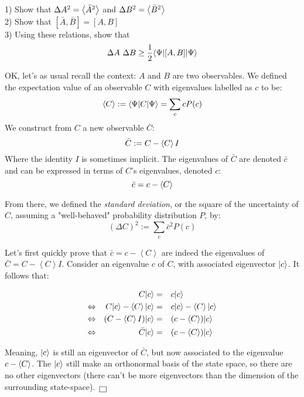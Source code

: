 \documentclass[solutions.tex]{subfiles}
\begin{document}
\maketitle
\begin{exercise} 1) Show that
$\Delta A^2 = \avg{\bar{A}^2}$ and
$\Delta B^2 = \avg{\bar{B}^2}$ \\

2) Show that $[\bar{A}, \bar{B}] = [A, B]$ \\

3) Using these relations, show that
\[
	\Delta A\ \Delta B \geq \frac12\bra{\Psi}[A, B]\ket{\Psi}
\]
\end{exercise}
OK, let's as usual recall the context: $A$ and $B$ are
two observables. We defined the expectation value of an observable
$C$ with eigenvalues labelled as $c$ to be:
\[
	\avg{C} := \bra{\Psi}C\ket{\Psi} = \sum_c cP(c)
\]
We construct from $C$ a new observable $\bar{C}$:
\[
	\bar{C} := C-\avg{C}I
\]
Where the identity $I$ is sometimes implicit. The eigenvalues
of $\bar{C}$ are denoted $\bar{c}$ and can be expressed in terms
of $C$'s eigenvalues, denoted $c$:
\[
	\bar{c} = c-\avg{C}
\]

From there, we defined the \textit{standard deviation}, or the
square of the uncertainty of $C$, assuming a "well-behaved" probability
distribution $P$, by:
\[
	(\Delta C)^2 := \sum_c \bar{c}^2P(c)
\]

\hrr

Let's first quickly prove that $\bar{c} = c-\left<C\right>$ are
indeed the eigenvalues of $\bar{C} = C-\left<C\right>I$.  Consider
an eigenvalue $c$ of $C$, with associated eigenvector $\ket{c}$.
It follows that:

\begin{equation*}\begin{aligned}
	~ && C\ket{c} &=&& c\ket{c} \\
	\Leftrightarrow &&
	C\ket{c} - \avg{C}\ket{c} &=&& c\ket{c} - \avg{C}\ket{c} \\
	\Leftrightarrow &&
	(C -\avg{C}I)\ket{c} &=&& (c - \avg{C})\ket{c} \\
	\Leftrightarrow &&
	\bar{C}\ket{c} &=&& (c - \avg{C})\ket{c} \\
\end{aligned}\end{equation*}

Meaning, $\ket{c}$ is still an eigenvector of $\bar{C}$, but
now associated to the eigenvalue $c-\avg{C}$. The $\ket{c}$
still make an orthonormal basis of the state space, so there
are no other eigenvectors (there can't be more eigenvectors
than the dimension of the surrounding state-space). $\qed$
\end{document}
